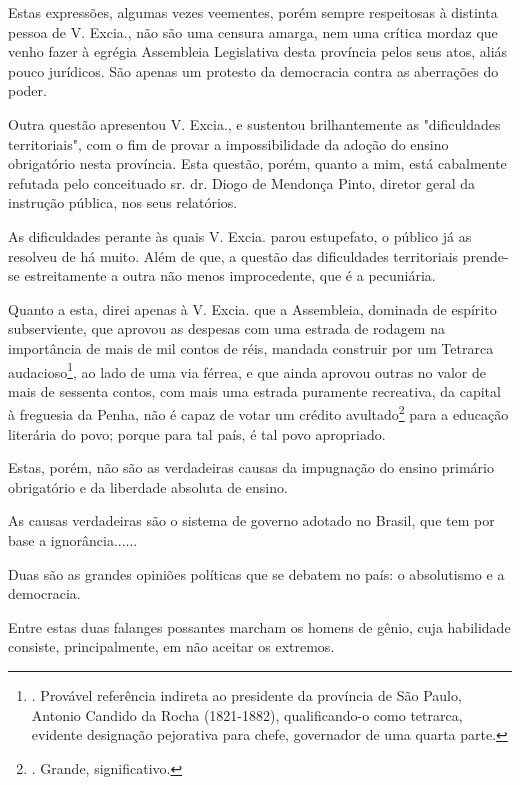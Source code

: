 Estas expressões, algumas vezes veementes, porém sempre respeitosas à
distinta pessoa de V. Excia., não são uma censura amarga, nem uma
crítica mordaz que venho fazer à egrégia Assembleia Legislativa desta
província pelos seus atos, aliás pouco jurídicos. São apenas um protesto
da democracia contra as aberrações do poder.

Outra questão apresentou V. Excia., e sustentou brilhantemente as
"dificuldades territoriais", com o fim de provar a impossibilidade da
adoção do ensino obrigatório nesta província. Esta questão, porém,
quanto a mim, está cabalmente refutada pelo conceituado sr. dr. Diogo de
Mendonça Pinto, diretor geral da instrução pública, nos seus relatórios.

As dificuldades perante às quais V. Excia. parou estupefato, o público
já as resolveu de há muito. Além de que, a questão das dificuldades
territoriais prende-se estreitamente a outra não menos improcedente, que
é a pecuniária.

Quanto a esta, direi apenas à V. Excia. que a Assembleia, dominada de
espírito subserviente, que aprovou as despesas com uma estrada de
rodagem na importância de mais de mil contos de réis, mandada construir
por um Tetrarca audacioso\footnote{. Provável referência indireta ao
  presidente da província de São Paulo, Antonio Candido da Rocha
  (1821-1882), qualificando-o como tetrarca, evidente designação
  pejorativa para chefe, governador de uma quarta parte.}, ao lado de
uma via férrea, e que ainda aprovou outras no valor de mais de sessenta
contos, com mais uma estrada puramente recreativa, da capital à
freguesia da Penha, não é capaz de votar um crédito avultado\footnote{.
  Grande, significativo.} para a educação literária do povo; porque para
tal país, é tal povo apropriado.

Estas, porém, não são as verdadeiras causas da impugnação do ensino
primário obrigatório e da liberdade absoluta de ensino.

As causas verdadeiras são o sistema de governo adotado no Brasil, que
tem por base a ignorância......

Duas são as grandes opiniões políticas que se debatem no país: o
absolutismo e a democracia.

Entre estas duas falanges possantes marcham os homens de gênio, cuja
habilidade consiste, principalmente, em não aceitar os extremos.


